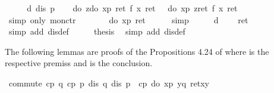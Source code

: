 \begin{isabellebody}
\isamarkupfalse%
\ {\isacharminus}\isanewline
\ \ \isamarkupfalse%
\ d{\isacharcolon}\ {\isachardoublequote}dis\ p{\isachardoublequote}\isanewline
\ \ \isamarkupfalse%
\ {\isachardoublequote}do\ {\isacharbraceleft}z{\isasymleftarrow}do\ {\isacharbraceleft}x{\isasymleftarrow}p{\isacharsemicolon}\ ret\ {\isacharparenleft}f\ x{\isacharparenright}{\isacharbraceright}{\isacharsemicolon}\ ret\ {\isacharparenleft}{\isacharparenright}{\isacharbraceright}\ {\isacharequal}\ do\ {\isacharbraceleft}x{\isasymleftarrow}p{\isacharsemicolon}\ z{\isasymleftarrow}ret\ {\isacharparenleft}f\ x{\isacharparenright}{\isacharsemicolon}\ ret\ {\isacharparenleft}{\isacharparenright}{\isacharbraceright}{\isachardoublequote}\isanewline
\ \ \ \ \isamarkupfalse%
\ {\isacharparenleft}simp\ only{\isacharcolon}\ mon{\isacharunderscore}ctr{\isacharparenright}\isanewline
\ \ \isamarkupfalse%
\ \isamarkupfalse%
\ {\isachardoublequote}{\isasymdots}\ {\isacharequal}\ do\ {\isacharbraceleft}x{\isasymleftarrow}p{\isacharsemicolon}\ ret{\isacharparenleft}{\isacharparenright}{\isacharbraceright}{\isachardoublequote}\isanewline
\ \ \ \ \isamarkupfalse%
\ simp\isanewline
\ \ \isamarkupfalse%
\ \isamarkupfalse%
\ d\ \isamarkupfalse%
\ {\isachardoublequote}{\isasymdots}\ {\isacharequal}\ ret\ {\isacharparenleft}{\isacharparenright}{\isachardoublequote}\ \isamarkupfalse%
\ {\isacharparenleft}simp\ add{\isacharcolon}\ dis{\isacharunderscore}def{\isacharparenright}\isanewline
\ \ \isamarkupfalse%
\ \isamarkupfalse%
\ {\isacharquery}thesis\ \isamarkupfalse%
\ {\isacharparenleft}simp\ add{\isacharcolon}\ dis{\isacharunderscore}def{\isacharparenright}\isanewline
\isamarkupfalse%
\isamarkupfalse%
%
\begin{isamarkuptext}%
The following lemmas  are proofs of the Propositions 
  4.24 of \cite{SchroederMossakowski:PDL} where  is the respective premiss
  and  is the conclusion.
  \label{isa:commute-1-2}%
\end{isamarkuptext}%
\isamarkuptrue%
\ commute{\isacharunderscore}{}{\isacharunderscore}{}{\isacharcolon}\ {\isachardoublequote}{\isasymlbrakk}cp\ q{\isacharsemicolon}\ cp\ p{\isacharsemicolon}\ dis\ q{\isacharsemicolon}\ dis\ p{\isasymrbrakk}\ {\isasymLongrightarrow}\ cp\ {\isacharparenleft}do\ {\isacharbraceleft}x{\isasymleftarrow}p{\isacharsemicolon}\ y{\isasymleftarrow}q{\isacharsemicolon}\ ret{\isacharparenleft}x{\isacharcomma}y{\isacharparenright}{\isacharbraceright}{\isacharparenright}\isanewline

\end{isabellebody}
